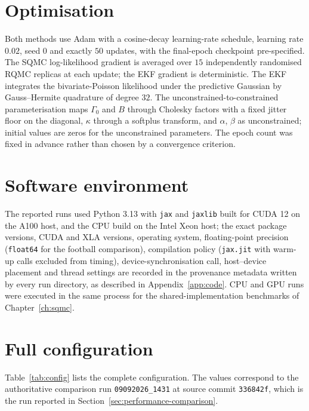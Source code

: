 \section{Optimisation}

Both methods use Adam with a cosine-decay learning-rate schedule, learning rate $0.02$, seed $0$ and exactly $50$ updates, with the final-epoch checkpoint pre-specified. The SQMC log-likelihood gradient is averaged over $15$ independently randomised RQMC replicas at each update; the EKF gradient is deterministic. The EKF integrates the bivariate-Poisson likelihood under the predictive Gaussian by Gauss--Hermite quadrature of degree $32$. The unconstrained-to-constrained parameterisation maps $\Gamma_0$ and $B$ through Cholesky factors with a fixed jitter floor on the diagonal, $\kappa$ through a softplus transform, and $\alpha$, $\beta$ as unconstrained; initial values are zeros for the unconstrained parameters. The epoch count was fixed in advance rather than chosen by a convergence criterion.

\section{Software environment}

The reported runs used Python 3.13 with \texttt{jax} and \texttt{jaxlib} built for CUDA 12 on the A100 host, and the CPU build on the Intel Xeon host; the exact package versions, CUDA and XLA versions, operating system, floating-point precision (\texttt{float64} for the football comparison), compilation policy (\texttt{jax.jit} with warm-up calls excluded from timing), device-synchronisation call, host--device placement and thread settings are recorded in the provenance metadata written by every run directory, as described in Appendix~\ref{app:code}. CPU and GPU runs were executed in the same process for the shared-implementation benchmarks of Chapter~\ref{ch:sqmc}.

\section{Full configuration}

Table~\ref{tab:config} lists the complete configuration. The values correspond to the authoritative comparison run \texttt{09092026\_1431} at source commit \texttt{336842f}, which is the run reported in Section~\ref{sec:performance-comparison}.

